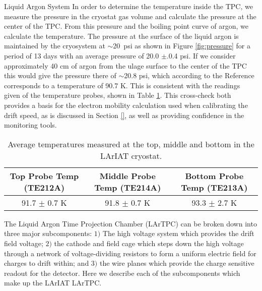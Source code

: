 \begin{subsubsection}{Liquid Argon System}
In order to determine the temperature inside the TPC, we measure the pressure in the cryostat gas volume and calculate the pressure at the center of the TPC. From this pressure and the boiling point curve of argon, we calculate the temperature. The pressure at the surface of the liquid argon is maintained by the cryosystem at $\sim$20~psi as shown in Figure \ref{fig:pressure} for a period of 13 days with an average pressure of 20.0 $\pm$.0.4 psi. If we consider approximately 40 cm of argon from the ulage surface to the center of the TPC this would give the pressure there of $\sim$20.8 psi, which according to the Reference \cite{} corresponds to a temperature of 90.7 K. This is consistent with the readings given of the temperature probes, shown in Table \ref{tab:temp}. This cross-check both provides a basis for the electron mobility calculation used when calibrating the drift speed, as is discussed in Section \ref{}, as well as providing confidence in the monitoring tools.


\begin{table}[h!]
\centering
\caption{Average temperatures measured at the top, middle and bottom in the LArIAT cryostat.}
\label{tab:temp}
\begin{tabular}{|c|c|c|}
\hline
Top Probe Temp (TE212A) & Middle Probe Temp (TE214A)   & Bottom Probe Temp (TE213A)  \\ \hline
91.7 $\pm$ 0.7 K &  91.8 $\pm$ 0.7 K                   & 93.3 $\pm$ 2.7 K       \\ \hline
\end{tabular}
\end{table}


\end{subsubsection}
The Liquid Argon Time Projection Chamber (LArTPC) can be broken down into three major subcomponents: $1)$ The high voltage system which provides the drift field voltage; $2)$ the cathode and field cage which steps down the high voltage through a network of voltage-dividing resistors to form a uniform electric field for charges to drift within; and $3)$ the wire planes which provide the charge sensitive readout for the detector. Here we describe each of the subcomponents which make up the LArIAT LArTPC.

